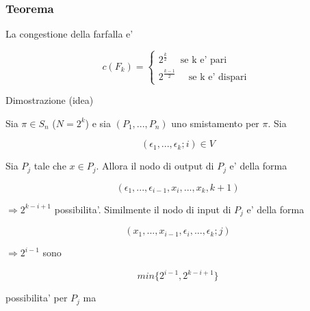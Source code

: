 \documentclass{article}
\begin{document}
        \subsubsection{Teorema}
        \begin{flushleft}
          La congestione della farfalla e'
        \end{flushleft}
        \begin{equation*}
          c(F_k)=\begin{cases}
            2^{\frac{k}{2}} \quad \text{ se k e' pari }\\ 
            2^{\frac{k-1}{2}} \quad \text{  se k e' dispari }
          \end{cases}
        \end{equation*}
        \begin{flushleft}
          Dimostrazione (idea) 
        \end{flushleft}
        \begin{flushleft}
          Sia $\pi \in S_n$ ($N=2^k$) e sia $(P_1,...,P_n)$ uno smistamento per $\pi$. Sia
        \end{flushleft}
        \begin{equation*}
          (\epsilon_1,...,\epsilon_k;i)\in V
        \end{equation*}
        \begin{flushleft}
          Sia $P_j$ tale che $x\in P_j$. Allora il nodo di output di $P_j$ e' della forma
        \end{flushleft}
        \begin{equation*}
          (\epsilon_1,...,\epsilon_{i-1},x_i,...,x_k,k+1)
        \end{equation*}
        \begin{flushleft}
          $\Rightarrow 2^{k-i+1}$ possibilita'. Similmente il nodo di input di $P_j$ e' della forma
        \end{flushleft}
        \begin{equation*}
          (x_1,...,x_{i-1},\epsilon_i,...,\epsilon_k;j)
        \end{equation*}
        \begin{flushleft}
          $\Rightarrow 2^{i-1}$ sono 
        \end{flushleft}
        \begin{equation*}
          min\{2^{i-1},2^{k-i+1}\}
        \end{equation*}
        \begin{flushleft}
          possibilita' per $P_j$ ma
        \end{flushleft}
\end{document}
